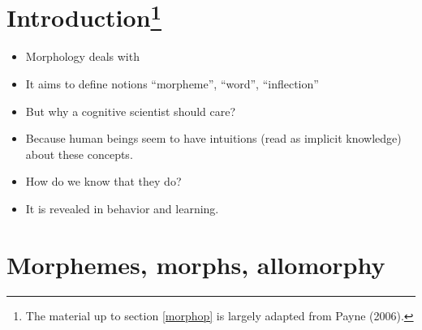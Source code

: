\documentclass[11pt]{article}
\begin{document}
\section{Introduction\protect\footnote{The material up to section \ref{morphop}
is largely adapted from Payne (2006).}}

\begin{itemize}
\item Morphology deals with 
\item It aims to define notions ``morpheme'', ``word'', ``inflection''
\item But why a cognitive scientist should care?
\item Because human beings seem to have intuitions (read as implicit knowledge)
about these concepts.
\item How do we know that they do?
\item It is revealed in behavior and learning. 
\end{itemize}


\section{Morphemes, morphs, allomorphy}
\end{document}
